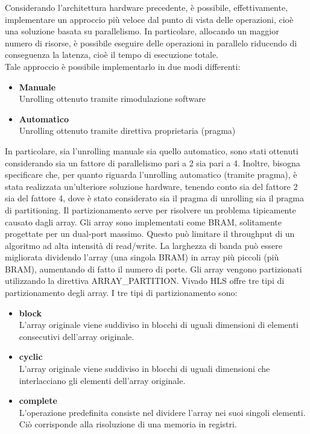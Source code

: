 Considerando l'architettura hardware precedente, è possibile, effettivamente, implementare un approccio più veloce dal punto di vista delle operazioni, cioè una soluzione basata su parallelismo. In particolare, allocando un maggior numero di risorse, è possibile eseguire delle operazioni in parallelo riducendo di conseguenza la latenza, cioè il tempo di esecuzione totale.
\\
Tale approccio è possibile implementarlo in due modi differenti:
\begin{itemize}
    \item \textbf{Manuale}\\Unrolling ottenuto tramite rimodulazione software
    \item \textbf{Automatico}\\Unrolling ottenuto tramite direttiva proprietaria (pragma)
\end{itemize}

In particolare, sia l'unrolling manuale sia quello automatico, sono stati ottenuti considerando sia un fattore di parallelismo pari a 2 sia pari a 4. Inoltre, bisogna specificare che, per quanto riguarda l'unrolling automatico (tramite pragma), è stata realizzata un'ulteriore soluzione hardware, tenendo conto sia del fattore 2 sia del fattore 4, dove è stato considerato sia il pragma di unrolling sia il pragma di partitioning. Il partizionamento serve per risolvere un problema tipicamente causato dagli array. Gli array sono implementati come BRAM, solitamente progettate per un dual-port massimo. Questo può limitare il throughput di un algoritmo ad alta intensità di read/write. La larghezza di banda può essere migliorata dividendo l'array (una singola BRAM) in array più piccoli (più BRAM), aumentando di fatto il numero di porte. Gli array vengono partizionati utilizzando la direttiva ARRAY\_PARTITION. Vivado HLS offre tre tipi di partizionamento degli array. I tre tipi di partizionamento sono:
\begin{itemize}
    \item \textbf{block}\\L'array originale viene suddiviso in blocchi di uguali dimensioni di elementi consecutivi dell'array originale.
    \item \textbf{cyclic}\\L'array originale viene suddiviso in blocchi di uguali dimensioni che interlacciano gli elementi dell'array originale.
    \item \textbf{complete}\\L'operazione predefinita consiste nel dividere l'array nei suoi singoli elementi. Ciò corrisponde alla risoluzione di una memoria in registri.
\end{itemize}

